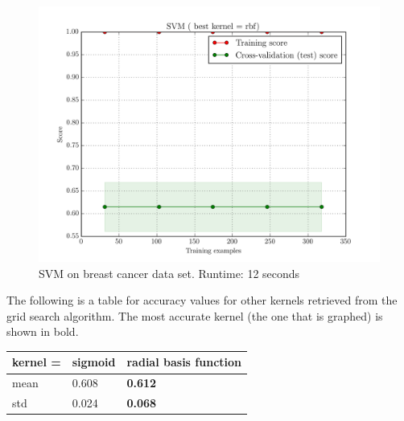 \begin{figure}[H]
    \centering
    \includegraphics[width=.7\textwidth]{breast/svm.png}
    \caption{SVM on breast cancer data set. Runtime: 12 seconds}
\end{figure}

The following is a table for accuracy values for other kernels retrieved from the grid search algorithm.
The most accurate kernel (the one that is graphed) is shown in bold.
\begin{center}
    \begin{tabular}{l || l | l}
         kernel = & sigmoid & \textbf{radial basis function}\\
         \hline
         mean     & 0.608   & \textbf{0.612}\\
         std      & 0.024   & \textbf{0.068}
    \end{tabular}
\end{center}